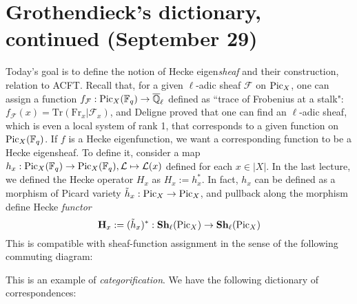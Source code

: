 \newpage
\section{Grothendieck's dictionary, continued (September 29)}

Today's goal is to define the notion of Hecke eigen\emph{sheaf} and their construction, relation to ACFT.
Recall that, for a given $\ell$-adic sheaf $\mathcal{F}$ on $\operatorname{\mathrm{Pic}}_X$, 
one can assign a function $f_{\mathcal{F}}: \operatorname{\mathrm{Pic}}_X(\mathbb{F}_q) \to \overline{\mathbb{Q}}_{\ell}$
defined as ``trace of Frobenius at a stalk": $f_{\mathcal{F}}(x) = \mathrm{Tr}(\mathrm{Fr}_{x}|\mathcal{F}_{x})$,
and Deligne proved that one can find an $\ell$-adic sheaf, which is even a local system of rank 1, that corresponds to a given function on $\operatorname{\mathrm{Pic}}_X(\mathbb{F}_{q})$.
If $f$ is a Hecke eigenfunction, we want a corresponding function to be a Hecke eigensheaf.
To define it, consider a map $h_{x}: \operatorname{\mathrm{Pic}}_X(\mathbb{F}_{q}) \to \operatorname{\mathrm{Pic}}_X(\mathbb{F}_{q}), \mathcal{L}\mapsto \mathcal{L}(x)$
defined for each $x \in |X|$.
In the last lecture, we defined the Hecke operator $H_{x}$ as $H_{x}:= h_{x}^{*}$.
In fact, $h_{x}$ can be defined as a morphism of Picard variety $\tilde{h}_{x}: \operatorname{\mathrm{Pic}}_X \to \operatorname{\mathrm{Pic}}_X$,
and pullback along the morphism define Hecke \emph{functor}
$$
\mathbf{H}_{x}:= (\tilde{h}_{x})^{*}: \mathbf{Sh}_{\ell}(\operatorname{\mathrm{Pic}}_X) \to \mathbf{Sh}_{\ell}(\operatorname{\mathrm{Pic}}_X)
$$
This is compatible with sheaf-function assignment in the sense of the following commuting diagram:
\begin{center}
\end{center}
This is an example of \emph{categorification}. We have the following dictionary of correspondences:
\begin{center}
    
\end{center}

